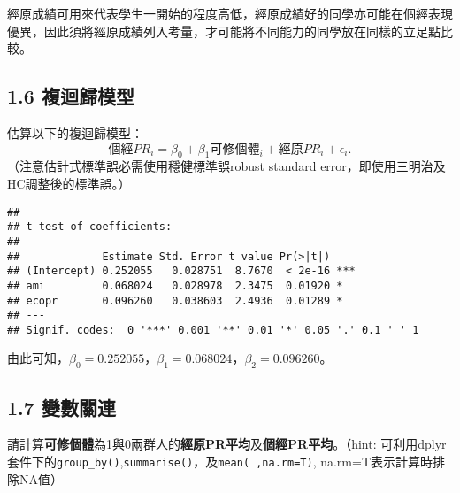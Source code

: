 \documentclass[]{article}
\newenvironment{Shaded}{\begin{snugshade}}{\end{snugshade}}
\newcommand{\KeywordTok}[1]{\textcolor[rgb]{0.13,0.29,0.53}{\textbf{#1}}}
\newcommand{\DataTypeTok}[1]{\textcolor[rgb]{0.13,0.29,0.53}{#1}}
\newcommand{\DecValTok}[1]{\textcolor[rgb]{0.00,0.00,0.81}{#1}}
\newcommand{\StringTok}[1]{\textcolor[rgb]{0.31,0.60,0.02}{#1}}
\newcommand{\OperatorTok}[1]{\textcolor[rgb]{0.81,0.36,0.00}{\textbf{#1}}}
\newcommand{\NormalTok}[1]{#1}
\begin{document}
經原成績可用來代表學生一開始的程度高低，經原成績好的同學亦可能在個經表現優異，因此須將經原成績列入考量，才可能將不同能力的同學放在同樣的立足點比較。

\subsection{1.6 複迴歸模型}

估算以下的複迴歸模型：
\[個經PR_i=\beta_0+\beta_1 可修個體_i+經原PR_i+\epsilon_i.\]
（注意估計式標準誤必需使用穩健標準誤robust standard
error，即使用三明治及HC調整後的標準誤。）

\begin{Shaded}
\end{Shaded}

\begin{verbatim}
## 
## t test of coefficients:
## 
##             Estimate Std. Error t value Pr(>|t|)    
## (Intercept) 0.252055   0.028751  8.7670  < 2e-16 ***
## ami         0.068024   0.028978  2.3475  0.01920 *  
## ecopr       0.096260   0.038603  2.4936  0.01289 *  
## ---
## Signif. codes:  0 '***' 0.001 '**' 0.01 '*' 0.05 '.' 0.1 ' ' 1
\end{verbatim}

由此可知，\(\beta_{0}=0.252055\)，\(\beta_{1}=0.068024\)，\(\beta_{2}=0.096260\)。

\subsection{1.7 變數關連}

請計算\textbf{可修個體}為1與0兩群人的\textbf{經原PR平均}及\textbf{個經PR平均}。（hint:
可利用dplyr套件下的\texttt{group\_by()},\texttt{summarise()}，及\texttt{mean(\ ,na.rm=T)},
na.rm=T表示計算時排除NA值）

\begin{Shaded}
\end{Shaded}
\end{document}
